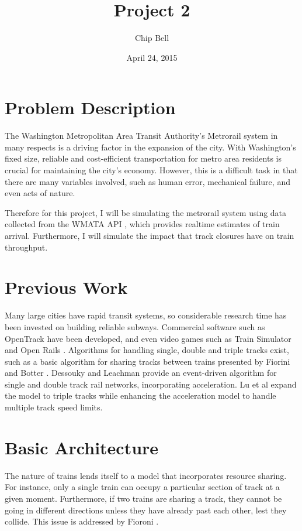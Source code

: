 \documentclass[a4paper,12pt]{article}
\begin{document}
\title{Project 2}
\author{Chip Bell}
\date{April 24, 2015}
\maketitle

\section{Problem Description}
The Washington Metropolitan Area Transit Authority's Metrorail system in many respects is a driving factor in the
expansion of the city. With Washington's fixed size, reliable and cost-efficient transportation for metro area
residents is crucial for maintaining the city's economy. However, this is a difficult task in that there are many
variables involved, such as human error, mechanical failure, and even acts of nature.

Therefore for this project, I will be simulating the metrorail system using data collected from the WMATA API
\cite{wmataapi}, which provides realtime estimates of train arrival. Furthermore, I will simulate the impact that track
closures have on train throughput.

\section{Previous Work}
Many large cities have rapid transit systems, so considerable research time has been invested on building reliable
subways. Commercial software such as OpenTrack \cite{opentrack} have been developed, and even video games such as Train
Simulator \cite{trainsimulator} and Open Rails \cite{openrails}. Algorithms for handling single, double and triple tracks exist,
such as a basic
algorithm for sharing tracks between trains presented by Fiorini and Botter \cite{fioroni}. Dessouky and Leachman
\cite{dessouky_leachman_95} provide an event-driven algorithm for single and double track rail networks, incorporating
acceleration. Lu et al \cite{quan_lu} expand the model to triple tracks while enhancing the acceleration model to
handle multiple track speed limits.

\section{Basic Architecture}
The nature of trains lends itself to a model that incorporates resource sharing. For instance, only a single train can
occupy a particular section of track at a given moment. Furthermore, if two trains are sharing a track, they cannot
be going in different directions unless they have already past each other, lest they collide. This issue is addressed
by Fioroni \cite{fioroni}.
\end{document}
